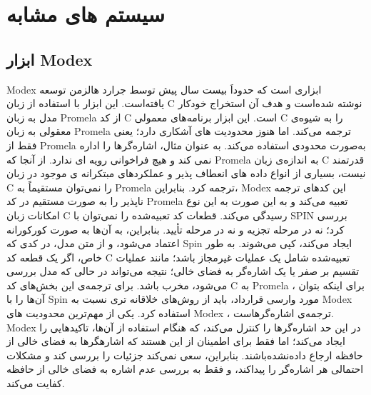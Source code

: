 \chapter{سیستم های مشابه}

\section{ابزار Modex}
Modex \cite{2}  ابزاری است که حدوداَ بیست سال پیش توسط جرارد هالزمن  توسعه یافته‌است. این ابزار  با استفاده از زبان C نوشته شده‌است و هدف آن استخراج خودکار مدل به زبان Promela از کد C است. این ابزار برنامه‌های  معمولی C را به شیوه‌ی معقولی به زبان Promela ترجمه می‌کند. اما هنوز محدودیت های آشکاری دارد‌؛ یعنی فقط از Promela به‌صورت محدودی استفاده می‌کند. به عنوان مثال، اشاره‌گرها را اداره نمی کند و هیچ فراخوانی رویه ای ندارد. از آنجا که Promela به اندازه‌ی زبان C قدرتمند نیست، بسیاری از انواع داده های انعطاف پذیر و عملکردهای مبتکرانه ی موجود در زبان C را نمی‌توان مستقیماً به Promela  ترجمه کرد. بنابراین، Modex  این کدهای ترجمه ناپذیر را به صورت مستقیم در کد Promela تعبیه می‌کند و به این صورت به این نوع امکانات زبان C رسیدگی می‌کند. قطعات کد تعبیه‌شده را نمی‌توان با SPIN بررسی کرد؛ نه در مرحله تجزیه و نه در مرحله تأیید. بنابراین، به آن‌ها به صورت کورکورانه اعتماد می‌شود، و از متن مدل، در کدی که Spin ایجاد می‌کند، کپی می‌شوند. به طور خاص، اگر یک قطعه کد C تعبیه‌شده شامل یک عملیات غیرمجاز باشد؛ مانند عملیات تقسیم بر صفر یا یک اشاره‌گر به فضای خالی؛ نتیجه می‌تواند در حالی که مدل بررسی می‌شود، مخرب باشد. برای ترجمه‌ی این بخش‌های کد C به Promela ، برای اینکه بتوان آن‌ها را با Spin مورد وارسی قرارداد، باید از روش‌های خلاقانه تری نسبت به Modex استفاده کرد. یکی از مهم‌ترین محدودیت های Modex ، ترجمه‌ی اشاره‌گرهاست. Modex در این حد  اشار‌ه‌گرها را کنترل می‌کند، که هنگام استفاده از آن‌ها، تاکیدهایی را ایجاد می‌کند؛ اما فقط برای اطمینان از این هستند که اشاره‏گرها به فضای خالی از حافظه ارجاع‌ داده‌نشده‌باشند. بنابراین، سعی نمی‌کند جزئیات را بررسی کند و مشکلات احتمالی هر اشاره‌گر را پیدا‌کند، و فقط به بررسی عدم اشاره‌ به فضای خالی از حافظه کفایت می‌کند.


